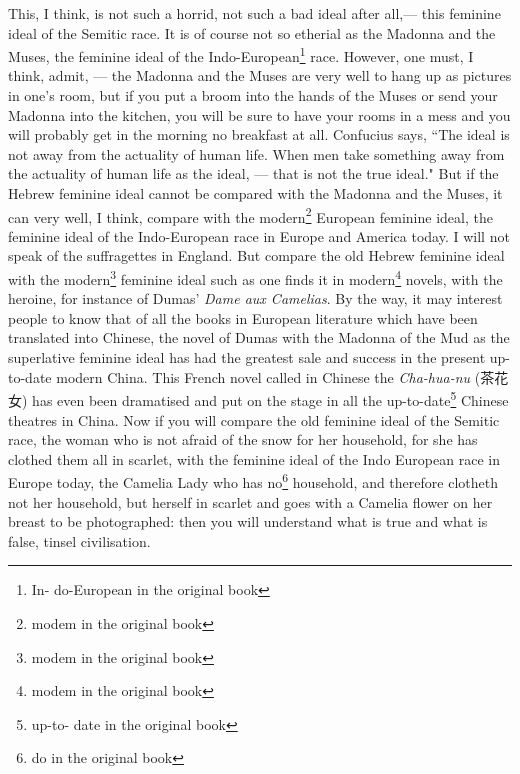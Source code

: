 This, I think, is not such a horrid, not such a bad ideal after all,--- this feminine ideal  of the Semitic race.
It is of course not so etherial as the Madonna and the Muses, the feminine ideal of the Indo-European\footnote{In- do-European in the original book} race.
However, one must, I think, admit, --- the Madonna and the Muses are very well to hang up as pictures in one's room, but if you put a broom into the hands of the Muses or send your Madonna into the kitchen, you will be sure to have your rooms in a mess and you will probably get in the morning no breakfast at all.
Confucius says, ``The ideal is not away from the actuality of human life.
When men take something away from the actuality of human life as the ideal, --- that is not the true ideal."
But if the Hebrew feminine ideal cannot be compared with the Madonna and the Muses, it can very well, I think, compare with the modern\footnote{modem in the original book} European feminine ideal, the feminine ideal of the Indo-European race in Europe and America today.
I will not speak of the suffragettes in England.
But compare the old Hebrew feminine ideal with the modern\footnote{modem in the original book} feminine ideal such as one finds it in modern\footnote{modem in the original book} novels, with the heroine, for instance of Dumas' \emph{Dame aux Camelias}. 
By the way, it may interest people to know that of all the books in European literature which have been translated into Chinese, the novel of Dumas with the Madonna of the Mud as the superlative feminine ideal has had the greatest sale and success in the present up-to-date modern China.
This French novel called in Chinese the \emph{Cha-hua-nu} (茶花女) has even been dramatised and put on the stage in all the up-to-date\footnote{up-to- date in the original book} Chinese theatres in China.
Now if you will compare the old feminine ideal of the Semitic race, the woman who is not afraid of the snow for her household, for she has clothed them all in scarlet, with the feminine ideal of the Indo European race in Europe today, the Camelia Lady who has no\footnote{do in the original book} household, and therefore clotheth not her household, but herself in scarlet and goes with a Camelia flower on her breast to be photographed: then you will understand what is true and what is false, tinsel civilisation.

